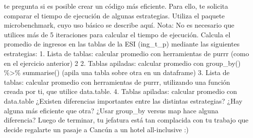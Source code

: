\documentclass[
]{article}
\begin{document}
te pregunta si es posible crear un código más eficiente. Para ello, te
solicita comparar el tiempo de ejecución de algunas estrategias. Utiliza
el paquete microbenchmark, cuyo uso básico se describe aquí. Nota: No es
necesario que utilices más de 5 iteraciones para calcular el tiempo de
ejecución. Calcula el promedio de ingresos en las tablas de la ESI
(ing\_t\_p) mediante las siguientes estrategias: 1. Lista de tablas:
calcular promedio con herramientas de purrr (como en el ejercicio
anterior) 2 2. Tablas apiladas: calcular promedio con group\_by()
\%\textgreater\% summarise() (apila una tabla sobre otra en un
dataframe) 3. Lista de tablas: calcular promedio con herramientas de
purrr, utilizando una función creada por ti, que utilice data.table. 4.
Tablas apiladas: calcular promedio con data.table ¿Existen diferencias
importantes entre las distintas estrategias? ¿Hay alguna más eficiente
que otra? ¿Usar group\_by versus map hace alguna diferencia? Luego de
terminar, tu jefatura está tan complacida con tu trabajo que decide
regalarte un pasaje a Cancún a un hotel all-inclusive :)
\end{document}
